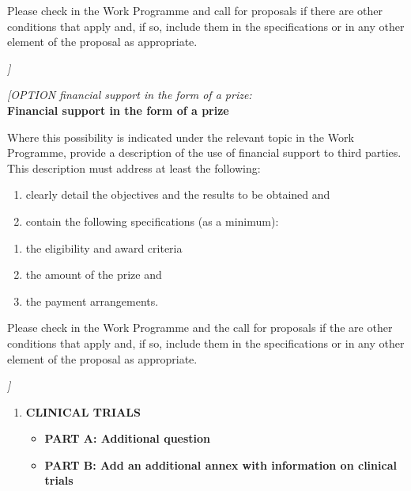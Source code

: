Please check in the Work Programme and call for proposals if there are
other conditions that apply and, if so, include them in the
specifications or in any other element of the proposal as appropriate.

\emph{{]}}

\emph{{[}OPTION financial support in the form of a prize: }\\
\textbf{Financial support in the form of a prize}

Where this possibility is indicated under the relevant topic in the Work
Programme, provide a description of the use of financial support to
third parties. This description must address at least the following:

\begin{enumerate}
\def\labelenumi{\arabic{enumi}.}
\item
  clearly detail the objectives and the results to be obtained and
\item
  contain the following specifications (as a minimum):
\end{enumerate}

\begin{enumerate}
\def\labelenumi{\alph{enumi}.}
\item
  the eligibility and award criteria
\item
  the amount of the prize and
\item
  the payment arrangements.
\end{enumerate}

Please check in the Work Programme and the call for proposals if the are
other conditions that apply and, if so, include them in the
specifications or in any other element of the proposal as appropriate.

\emph{{]}}

\begin{enumerate}
\def\labelenumi{\arabic{enumi}.}
\item
  \textbf{CLINICAL TRIALS}

  \begin{itemize}
  \item
    \textbf{PART A: Additional question}
  \item
    \textbf{PART B: Add an additional annex with information on clinical
    trials }
  \end{itemize}
\end{enumerate}

